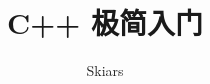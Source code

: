 \documentclass[hyperref,UTF8]{article}
\begin{document}
\title{C++ 极简入门}
\author{Skiars}

{\bfseries\maketitle}

\setcounter{tocdepth}{2}
\tableofcontents
\end{document}
